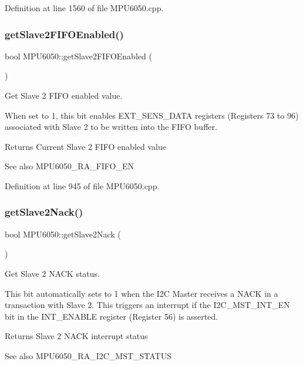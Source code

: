 Definition at line 1560 of file M\+P\+U6050.\+cpp.

\mbox{\label{classMPU6050_a3c2e29508607a655221a2fa4f4219b4d}} 
\subsubsection{\texorpdfstring{getSlave2FIFOEnabled()}{getSlave2FIFOEnabled()}}
{\footnotesize\ttfamily bool M\+P\+U6050\+::get\+Slave2\+F\+I\+F\+O\+Enabled (\begin{DoxyParamCaption}{ }\end{DoxyParamCaption})}



Get Slave 2 F\+I\+FO enabled value. 

When set to 1, this bit enables E\+X\+T\+\_\+\+S\+E\+N\+S\+\_\+\+D\+A\+TA registers (Registers 73 to 96) associated with Slave 2 to be written into the F\+I\+FO buffer. \begin{DoxyReturn}{Returns}
Current Slave 2 F\+I\+FO enabled value 
\end{DoxyReturn}
\begin{DoxySeeAlso}{See also}
M\+P\+U6050\+\_\+\+R\+A\+\_\+\+F\+I\+F\+O\+\_\+\+EN 
\end{DoxySeeAlso}


Definition at line 945 of file M\+P\+U6050.\+cpp.

\mbox{\label{classMPU6050_af4b5101dab501d6df2e0cae909120771}} 
\subsubsection{\texorpdfstring{getSlave2Nack()}{getSlave2Nack()}}
{\footnotesize\ttfamily bool M\+P\+U6050\+::get\+Slave2\+Nack (\begin{DoxyParamCaption}{ }\end{DoxyParamCaption})}



Get Slave 2 N\+A\+CK status. 

This bit automatically sets to 1 when the I2C Master receives a N\+A\+CK in a transaction with Slave 2. This triggers an interrupt if the I2\+C\+\_\+\+M\+S\+T\+\_\+\+I\+N\+T\+\_\+\+EN bit in the I\+N\+T\+\_\+\+E\+N\+A\+B\+LE register (Register 56) is asserted. \begin{DoxyReturn}{Returns}
Slave 2 N\+A\+CK interrupt status 
\end{DoxyReturn}
\begin{DoxySeeAlso}{See also}
M\+P\+U6050\+\_\+\+R\+A\+\_\+\+I2\+C\+\_\+\+M\+S\+T\+\_\+\+S\+T\+A\+T\+US 
\end{DoxySeeAlso}


